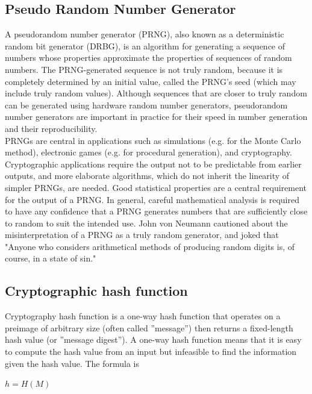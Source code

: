 \subsection{Pseudo Random Number Generator}

A pseudorandom number generator (PRNG), also known as a deterministic random bit generator (DRBG), is an algorithm for generating a sequence of numbers whose properties approximate the properties of sequences of random numbers. The PRNG-generated sequence is not truly random, because it is completely determined by an initial value, called the PRNG's seed (which may include truly random values). Although sequences that are closer to truly random can be generated using hardware random number generators, pseudorandom number generators are important in practice for their speed in number generation and their reproducibility.\\

\vspace{0.5cm}
PRNGs are central in applications such as simulations (e.g. for the Monte Carlo method), electronic games (e.g. for procedural generation), and cryptography. Cryptographic applications require the output not to be predictable from earlier outputs, and more elaborate algorithms, which do not inherit the linearity of simpler PRNGs, are needed.
Good statistical properties are a central requirement for the output of a PRNG. In general, careful mathematical analysis is required to have any confidence that a PRNG generates numbers that are sufficiently close to random to suit the intended use. John von Neumann cautioned about the misinterpretation of a PRNG as a truly random generator, and joked that "Anyone who considers arithmetical methods of producing random digits is, of course, in a state of sin."\\

\subsection{Cryptographic hash function}

Cryptography hash function is a one-way hash function that operates on a preimage of arbitrary size (often called ”message”) then returns a fixed-length hash value (or ”message digest”). A one-way hash function means that it is easy to compute the hash value from an input but infeasible to find the information given the hash value. The formula is\\
\vspace{0.2cm}
\begin{center}
$h = H(M)$\\
\end{center}
\vspace{0.2cm}

